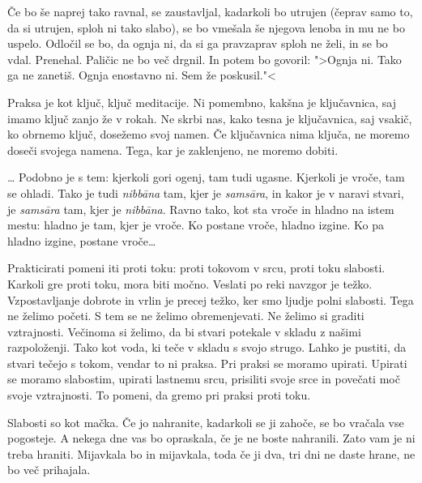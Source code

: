 Če bo še naprej tako ravnal, se zaustavljal, kadarkoli bo utrujen (čeprav samo to, da si utrujen, sploh ni tako slabo), se bo vmešala še njegova lenoba in mu ne bo uspelo. Odločil se bo, da ognja ni, da si ga pravzaprav sploh ne želi, in se bo vdal. Prenehal. Paličic ne bo več drgnil. In potem bo govoril: ">Ognja ni. Tako ga ne zanetiš. Ognja enostavno ni. Sem že poskusil."<

\vspace{-2.5\baselineskip}
\vspace{-0.5\baselineskip}

Praksa je kot ključ, ključ meditacije. Ni pomembno, kakšna je ključavnica, saj imamo ključ zanjo že v rokah. Ne skrbi nas, kako tesna je ključavnica, saj vsakič, ko obrnemo ključ, dosežemo svoj namen. Če ključavnica nima ključa, ne moremo doseči svojega namena. Tega, kar je zaklenjeno, ne moremo dobiti.

\clearpage


\ldots{} Podobno je s tem: kjerkoli gori ogenj, tam tudi ugasne. Kjerkoli je vroče, tam se ohladi. Tako je tudi \emph{nibbāna} tam, kjer je \emph{samsāra}, in kakor je v naravi stvari, je \emph{samsāra }tam, kjer je \emph{nibbāna}. Ravno tako, kot sta vroče in hladno na istem mestu: hladno je tam, kjer je vroče. Ko postane vroče, hladno izgine. Ko pa hladno izgine, postane vroče\ldots{}


Prakticirati pomeni iti proti toku: proti tokovom v srcu, proti toku slabosti. Karkoli gre proti toku, mora biti močno. Veslati po reki navzgor je težko. Vzpostavljanje dobrote in vrlin je precej težko, ker smo ljudje polni slabosti. Tega ne želimo početi. S tem se ne želimo obremenjevati. Ne želimo si graditi vztrajnosti. Večinoma si želimo, da bi stvari potekale v skladu z našimi razpoloženji. Tako kot voda, ki teče v skladu s svojo strugo. Lahko je pustiti, da stvari tečejo s tokom, vendar to ni praksa. Pri praksi se moramo upirati. Upirati se moramo slabostim, upirati lastnemu srcu, prisiliti svoje srce in povečati moč svoje vztrajnosti. To pomeni, da gremo pri praksi proti toku.

\clearpage


Slabosti so kot mačka. Če jo nahranite, kadarkoli se ji zahoče, se bo vračala vse pogosteje. A nekega dne vas bo opraskala, če je ne boste nahranili. Zato vam je ni treba hraniti. Mijavkala bo in mijavkala, toda če ji dva, tri dni ne daste hrane, ne bo več prihajala.

